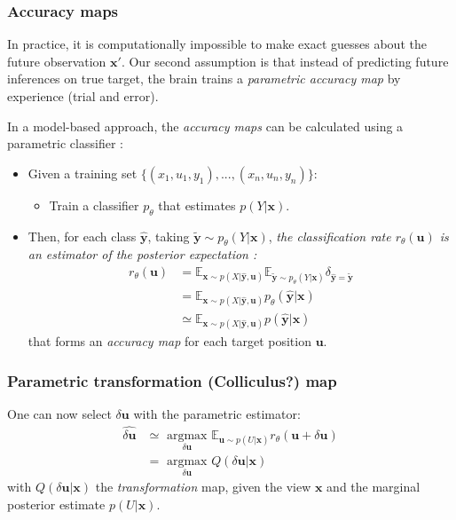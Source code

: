 \subsubsection{Accuracy maps}
 
In practice, it is computationally impossible to make exact guesses about the future observation $\boldsymbol{x}'$. Our second assumption is that instead of predicting future inferences on true target, the brain trains a \emph{parametric accuracy map} by experience (trial and error).


In a model-based approach, the \emph{accuracy maps} can be calculated using a parametric classifier : 
 \begin{itemize}
 \item Given a training set $\{(x_1, u_1, y_1), ..., (x_n, u_n, y_n)\}$:
 \begin{itemize}
 \item Train a classifier $p_\theta$ that estimates $p(Y|\boldsymbol{x})$. 
 \end{itemize}
 \item Then, for each class $\hat{\boldsymbol{y}}$, taking $\tilde{\boldsymbol{y}}\sim p_\theta(Y|\boldsymbol{x})$,\emph{ the classification rate $r_\theta(\boldsymbol{u})$ is an estimator of the posterior expectation :}
 \begin{align*}
 r_\theta(\boldsymbol{u}) 
 &= \mathbb{E}_{ \boldsymbol{x} \sim p(X|\hat{\boldsymbol{y}}, \boldsymbol{u})}
 \mathbb{E}_{\tilde{\boldsymbol{y}}\sim p_\theta(Y|\boldsymbol{x})} \delta_{\hat{\boldsymbol{y}}=\tilde{\boldsymbol{y}}}\\
 &= \mathbb{E}_{ \boldsymbol{x} \sim p(X|\hat{\boldsymbol{y}}, \boldsymbol{u})} p_\theta(\hat{\boldsymbol{y}}|\boldsymbol{x})\\
 &\simeq \mathbb{E}_{ \boldsymbol{x} \sim p(X|\hat{\boldsymbol{y}}, \boldsymbol{u})} p(\hat{\boldsymbol{y}}|\boldsymbol{x})
 \end{align*} 
 that forms an \emph{accuracy map} for each target position $\boldsymbol{u}$.\\
 \end{itemize}

\subsubsection{Parametric transformation (Colliculus?) map}

One can now select $\delta\boldsymbol{u}$ with the parametric estimator:
\begin{align*}
\widehat{\delta\boldsymbol{u}} &\simeq \underset{\delta\boldsymbol{u}}{\text{ argmax }} 
\mathbb{E}_{\boldsymbol{u}\sim p(U|\boldsymbol{x})}  
r_\theta(\boldsymbol{u}+\delta\boldsymbol{u})\\
&= \underset{\delta\boldsymbol{u}}{\text{ argmax }} Q(\delta\boldsymbol{u}|\boldsymbol{x})
\end{align*}
with $Q(\delta\boldsymbol{u}|\boldsymbol{x})$ the \emph{transformation} map, given the view $\boldsymbol{x}$ and the marginal posterior estimate $p(U|\boldsymbol{x})$. 

